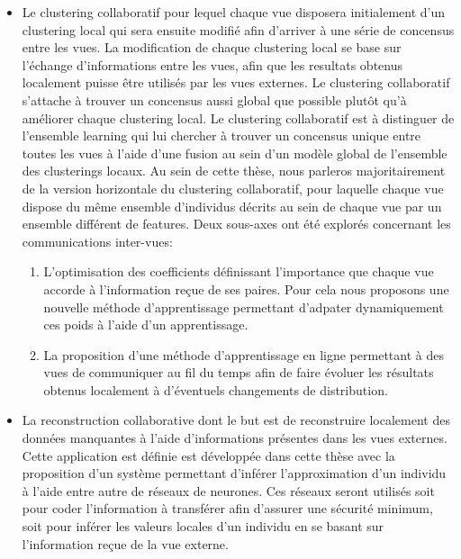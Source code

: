 \begin{itemize}
    \item Le clustering collaboratif pour lequel chaque vue disposera initialement d'un clustering local qui sera ensuite modifi\'{e} afin d'arriver \`{a} une s\'{e}rie de concensus entre les vues. La modification de chaque clustering local se base sur l'\'{e}change d'informations entre les vues, afin que les resultats obtenus localement puisse \^{e}tre utilis\'{e}s par les vues externes. Le clustering collaboratif s'attache \`{a} trouver un concensus aussi global que possible plutôt qu'\`{a} am\'{e}liorer chaque clustering local. Le clustering collaboratif est à distinguer de l'ensemble learning qui lui chercher à trouver un concensus unique entre toutes les vues à l'aide d'une fusion au sein d'un modèle global de l'ensemble des clusterings locaux. Au sein de cette th\`{e}se, nous parleros majoritairement de la version horizontale du clustering collaboratif, pour laquelle chaque vue dispose du m\^{e}me ensemble d'individus d\'{e}crits au sein de chaque vue par un ensemble diff\'{e}rent de features. Deux sous-axes ont été explorés concernant les communications inter-vues:
        \begin{enumerate}
            \item L'optimisation des coefficients définissant l'importance que chaque vue accorde à l'information reçue de ses paires. Pour cela nous proposons une nouvelle méthode d'apprentissage permettant d'adpater dynamiquement ces poids à l'aide d'un apprentissage.
            \item La proposition d'une méthode d'apprentissage en ligne permettant à des vues de communiquer au fil du temps afin de faire évoluer les résultats obtenus localement à d'éventuels changements de distribution.
        \end{enumerate}

    \item La reconstruction collaborative dont le but est de reconstruire localement des données manquantes à l'aide d'informations présentes dans les vues externes. Cette application est définie est développée dans cette thèse avec la proposition d'un système permettant d'inférer l'approximation d'un individu à l'aide entre autre de réseaux de neurones. Ces réseaux seront utilisés soit pour coder l'information à transférer afin d'assurer une sécurité minimum, soit pour inférer les valeurs locales d'un individu en se basant sur l'information reçue de la vue externe.
\end{itemize}



